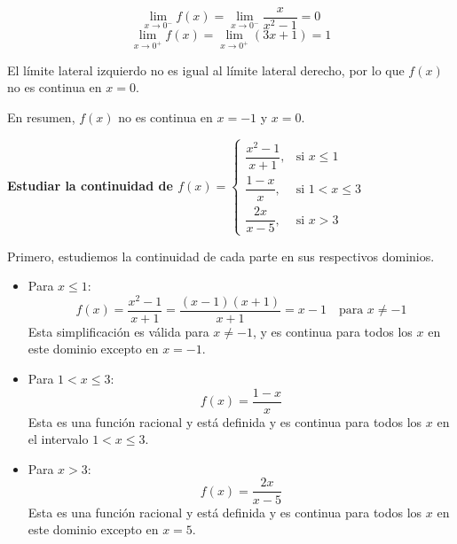 \documentclass[answers]{exam} %
\begin{document}
\begin{questions}
\begin{solution}
\begin{itemize}
                \[
                \lim_{x \to 0^-} f(x) = \lim_{x \to 0^-} \frac{x}{x^2 - 1} = 0
                \]
                \[
                \lim_{x \to 0^+} f(x) = \lim_{x \to 0^+} (3x + 1) = 1
                \]

                El límite lateral izquierdo no es igual al límite lateral derecho, por lo que \( f(x) \) no es continua en \( x = 0 \).
        \end{itemize}

        En resumen, \( f(x) \) no es continua en \( x = -1 \) y \( x = 0 \).
    \end{solution}

    \vspace{0.5cm}
    \question \large\textbf{Estudiar la continuidad de \(f(x) =
    \begin{cases}
        \dfrac{x^2-1}{x+1}, & \text{si } x \le 1 \\[1em]
        \dfrac{1-x}{x}, & \text{si } 1 < x \le 3 \\[1em]
        \dfrac{2x}{x-5}, & \text{si } x > 3 
    \end{cases}\) }
    \begin{solution}
    
        Primero, estudiemos la continuidad de cada parte en sus respectivos dominios.
        
        \begin{itemize}
            \item Para \( x \le 1 \):
                \[
                f(x) = \frac{x^2 - 1}{x + 1} = \frac{(x - 1)(x + 1)}{x + 1} = x - 1 \quad \text{para } x \neq -1
                \]
                Esta simplificación es válida para \( x \neq -1 \), y es continua para todos los \( x \) en este dominio excepto en \( x = -1 \).
                
            \item Para \( 1 < x \le 3 \):
                \[
                f(x) = \frac{1 - x}{x}
                \]
                Esta es una función racional y está definida y es continua para todos los \( x \) en el intervalo \( 1 < x \le 3 \).
                
            \item Para \( x > 3 \):
                \[
                f(x) = \frac{2x}{x - 5}
                \]
                Esta es una función racional y está definida y es continua para todos los \( x \) en este dominio excepto en \( x = 5 \).
        \end{itemize}
        

\end{solution}
\end{questions}
\end{document}
